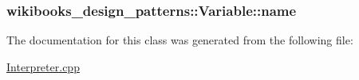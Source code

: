 \subsubsection[{\texorpdfstring{name}{name}}]{ wikibooks\+\_\+design\+\_\+patterns\+::\+Variable\+::name\hspace{0.3cm}{\ttfamily [private]}}\hypertarget{classwikibooks__design__patterns_1_1Variable_a68aaf6361a65a56622f5b91661921413}{}\label{classwikibooks__design__patterns_1_1Variable_a68aaf6361a65a56622f5b91661921413}


The documentation for this class was generated from the following file\+:\begin{DoxyCompactItemize}
\item 
\hyperlink{Interpreter_8cpp}{Interpreter.\+cpp}\end{DoxyCompactItemize}
